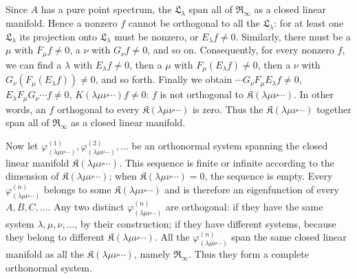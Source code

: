 \documentclass[fontsize=13pt,twoside,openany,headings=normal,parskip=false,bookmarkpackage=false,DIV=calc]{scrbook}
\begin{document}
Since $A$ has a pure point spectrum, the $\mathfrak L_\lambda$ span all of $\mathfrak R_\infty$ as a closed linear manifold. Hence a nonzero $f$ cannot be orthogonal to all the $\mathfrak L_\lambda$: for at least one $\mathfrak L_\lambda$ its projection onto $\mathfrak L_\lambda$ must be nonzero, or $E_\lambda f\ne0$. Similarly, there must be a $\mu$ with $F_\mu f\ne0$, a $\nu$ with $G_\nu f\ne0$, and so on. Consequently, for every nonzero $f$, we can find a $\lambda$ with $E_\lambda f\ne0$, then a $\mu$ with $F_\mu(E_\lambda f)\ne0$, then a $\nu$ with $G_\nu(F_\mu(E_\lambda f))\ne0$, and so forth. Finally we obtain $\cdots G_\nu F_\mu E_\lambda f\ne0$, $E_\lambda F_\mu G_\nu\cdots f\ne0$, $K(\lambda\mu\nu\cdots)f\ne0$: $f$ is not orthogonal to $\mathfrak K(\lambda\mu\nu\cdots)$. In other words, an $f$ orthogonal to every $\mathfrak K(\lambda\mu\nu\cdots)$ is zero. Thus the $\mathfrak K(\lambda\mu\nu\cdots)$ together span all of $\mathfrak R_\infty$ as a closed linear manifold.

Now let $\varphi^{(1)}_{(\lambda\mu\nu\cdots)},\varphi^{(2)}_{(\lambda\mu\nu\cdots)},\ldots$ be an orthonormal system spanning the closed linear manifold $\mathfrak K(\lambda\mu\nu\cdots)$. This sequence is finite or infinite according to the dimension of $\mathfrak K(\lambda\mu\nu\cdots)$; when $\mathfrak K(\lambda\mu\nu\cdots)=0$, the sequence is empty. Every $\varphi^{(n)}_{(\lambda\mu\nu\cdots)}$ belongs to some $\mathfrak K(\lambda\mu\nu\cdots)$ and is therefore an eigenfunction of every $A,B,C,\ldots$. Any two distinct $\varphi^{(n)}_{(\lambda\mu\nu\cdots)}$ are orthogonal: if they have the same system $\lambda,\mu,\nu,\ldots$, by their construction; if they have different systems, because they belong to different $\mathfrak K(\lambda\mu\nu\cdots)$. All the $\varphi^{(n)}_{(\lambda\mu\nu\cdots)}$ span the same closed linear manifold as all the $\mathfrak K(\lambda\mu\nu\cdots)$, namely $\mathfrak R_\infty$. Thus they form a complete orthonormal system.
\end{document}
